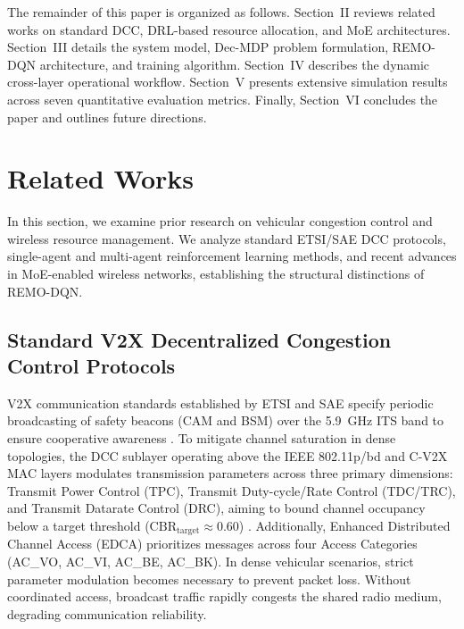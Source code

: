 \documentclass[journal]{IEEEtran}
\begin{document}
The remainder of this paper is organized as follows. Section~II reviews related works on standard DCC, DRL-based resource allocation, and MoE architectures. Section~III details the system model, Dec-MDP problem formulation, REMO-DQN architecture, and training algorithm. Section~IV describes the dynamic cross-layer operational workflow. Section~V presents extensive simulation results across seven quantitative evaluation metrics. Finally, Section~VI concludes the paper and outlines future directions.

\section{Related Works}
In this section, we examine prior research on vehicular congestion control and wireless resource management. We analyze standard ETSI/SAE DCC protocols, single-agent and multi-agent reinforcement learning methods, and recent advances in MoE-enabled wireless networks, establishing the structural distinctions of REMO-DQN.

\subsection{Standard V2X Decentralized Congestion Control Protocols}
V2X communication standards established by ETSI and SAE specify periodic broadcasting of safety beacons (CAM and BSM) over the 5.9~GHz ITS band to ensure cooperative awareness \cite{Arena2019Overview, Kenney2011DSRC, ETSI_EN_302_637_2, SAE_J2945_1}. To mitigate channel saturation in dense topologies, the DCC sublayer operating above the IEEE 802.11p/bd and C-V2X MAC layers modulates transmission parameters across three primary dimensions: Transmit Power Control (TPC), Transmit Duty-cycle/Rate Control (TDC/TRC), and Transmit Datarate Control (DRC), aiming to bound channel occupancy below a target threshold ($\text{CBR}_{\text{target}} \approx 0.60$) \cite{ETSI_TS_102_687, ETSI_TS_103_175}. Additionally, Enhanced Distributed Channel Access (EDCA) prioritizes messages across four Access Categories (AC\_VO, AC\_VI, AC\_BE, AC\_BK). In dense vehicular scenarios, strict parameter modulation becomes necessary to prevent packet loss. Without coordinated access, broadcast traffic rapidly congests the shared radio medium, degrading communication reliability.
\end{document}
